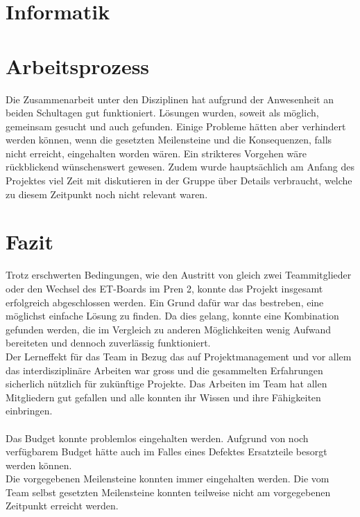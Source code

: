\documentclass[a4paper]{report}
\begin{document}
\section{Informatik}

\section{Arbeitsprozess}
	Die Zusammenarbeit unter den Disziplinen hat aufgrund der Anwesenheit an beiden Schultagen gut funktioniert. Lösungen wurden, soweit als möglich, gemeinsam gesucht und auch gefunden. Einige Probleme hätten aber verhindert werden können, wenn die gesetzten Meilensteine und die Konsequenzen, falls nicht erreicht, eingehalten worden wären. Ein strikteres Vorgehen wäre rückblickend wünschenswert gewesen. Zudem wurde hauptsächlich am Anfang des Projektes viel Zeit mit diskutieren in der Gruppe über Details verbraucht, welche zu diesem Zeitpunkt noch nicht relevant waren.
	
	\section{Fazit}
	Trotz erschwerten Bedingungen, wie den Austritt von gleich zwei Teammitglieder oder den Wechsel des ET-Boards im Pren 2, konnte das Projekt insgesamt erfolgreich abgeschlossen werden. Ein Grund dafür war das bestreben, eine möglichst einfache Lösung zu finden. Da dies gelang, konnte eine Kombination gefunden werden, die im Vergleich zu anderen Möglichkeiten wenig Aufwand bereiteten und dennoch zuverlässig funktioniert.\\
	Der Lerneffekt für das Team in Bezug das auf Projektmanagement und vor allem das interdisziplinäre Arbeiten war gross und die gesammelten Erfahrungen sicherlich nützlich für zukünftige Projekte. Das Arbeiten im Team hat allen Mitgliedern gut gefallen und alle konnten ihr Wissen und ihre Fähigkeiten einbringen.\\
	\\
	Das Budget konnte problemlos eingehalten werden. Aufgrund von noch verfügbarem Budget hätte auch im Falles eines Defektes Ersatzteile besorgt werden können.\\
	Die vorgegebenen Meilensteine konnten immer eingehalten werden. Die vom Team selbst gesetzten Meilensteine konnten teilweise nicht am vorgegebenen Zeitpunkt erreicht werden.
	
	
\listoffigures

\listoftables

\printbibliography
\end{document}

